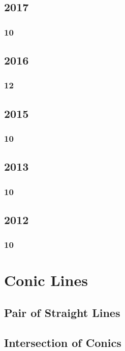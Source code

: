 \documentclass[11pt]{book}
\begin{document}
\section{2017}
\subsection{10}



\section{2016}
\subsection{12}

\section{2015}
\subsection{10}

\section{2013}
\subsection{10}

\section{2012}
\subsection{10}





% 
\backmatter
\appendix
\iffalse
\chapter{Conic Lines}
\section{Pair of Straight Lines}
%

\section{Intersection of Conics}

\end{document}
